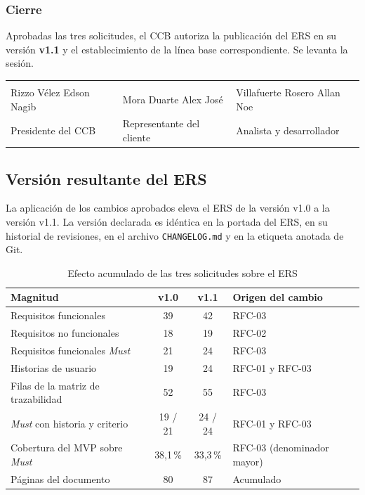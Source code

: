 \documentclass[11pt,letterpaper]{article}
\begin{document}
\subsubsection*{Cierre}

Aprobadas las tres solicitudes, el CCB autoriza la publicación del ERS en su versión \textbf{v1.1} y
el establecimiento de la línea base correspondiente. Se levanta la sesión.

\vspace{0.8cm}
\noindent\begin{tabular}{p{4.7cm} p{4.7cm} p{4.7cm}}
\hrulefill & \hrulefill & \hrulefill\\
\footnotesize Rizzo Vélez Edson Nagib & \footnotesize Mora Duarte Alex José & \footnotesize Villafuerte Rosero Allan Noe\\
\footnotesize Presidente del CCB & \footnotesize Representante del cliente & \footnotesize Analista y desarrollador\\
\end{tabular}

\subsection{Versión resultante del ERS}

La aplicación de los cambios aprobados eleva el ERS de la versión v1.0 a la versión v1.1. La versión
declarada es idéntica en la portada del ERS, en su historial de revisiones, en el archivo
\texttt{CHANGELOG.md} y en la etiqueta anotada de Git.

\begin{table}[H]
\centering\footnotesize
\caption{Efecto acumulado de las tres solicitudes sobre el ERS}
\begin{tabular}{L{6cm} c c L{4.6cm}}
\toprule
\textbf{Magnitud} & \textbf{v1.0} & \textbf{v1.1} & \textbf{Origen del cambio}\\
\midrule
Requisitos funcionales & 39 & 42 & RFC-03\\
Requisitos no funcionales & 18 & 19 & RFC-02\\
Requisitos funcionales \emph{Must} & 21 & 24 & RFC-03\\
Historias de usuario & 19 & 24 & RFC-01 y RFC-03\\
Filas de la matriz de trazabilidad & 52 & 55 & RFC-03\\
\emph{Must} con historia y criterio & 19 / 21 & 24 / 24 & RFC-01 y RFC-03\\
Cobertura del MVP sobre \emph{Must} & 38,1\,\% & 33,3\,\% & RFC-03 (denominador mayor)\\
Páginas del documento & 80 & 87 & Acumulado\\
\bottomrule
\end{tabular}
\end{table}
\end{document}
